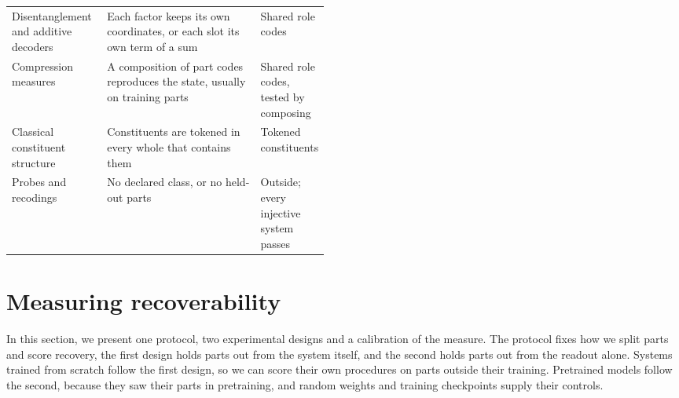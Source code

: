 \documentclass[10pt]{article}
\theoremstyle{plain}
\theoremstyle{remark}
\begin{document}
\begin{table}[t]
\begin{tabularx}{\linewidth}{@{}P{0.30\linewidth}YP{0.17\linewidth}@{}}
    Disentanglement and additive decoders \citep{bengio2013,lachapelle2023,wiedemer2024} & Each factor keeps its own coordinates, or each slot its own term of a sum & Shared role codes \\
    Compression measures \citep{andreas2019,elmoznino2024} & A composition of part codes reproduces the state, usually on training parts & Shared role codes, tested by composing \\
    \addlinespace
    Classical constituent structure \citep{fodor1988} & Constituents are tokened in every whole that contains them & Tokened constituents \\
    \addlinespace
    Probes \citep{belinkov2022,hewitt2019} and recodings \citep{zadrozny1994} & No declared class, or no held-out parts & Outside; every injective system passes \\
    \bottomrule
  \end{tabularx}
\end{table}

\section{Measuring recoverability}
\label{sec:experiments}

In this section, we present one protocol, two experimental designs and a calibration of the measure. The protocol fixes how we split parts and score recovery, the first design holds parts out from the system itself, and the second holds parts out from the readout alone. Systems trained from scratch follow the first design, so we can score their own procedures on parts outside their training. Pretrained models follow the second, because they saw their parts in pretraining, and random weights and training checkpoints supply their controls.
\end{document}
